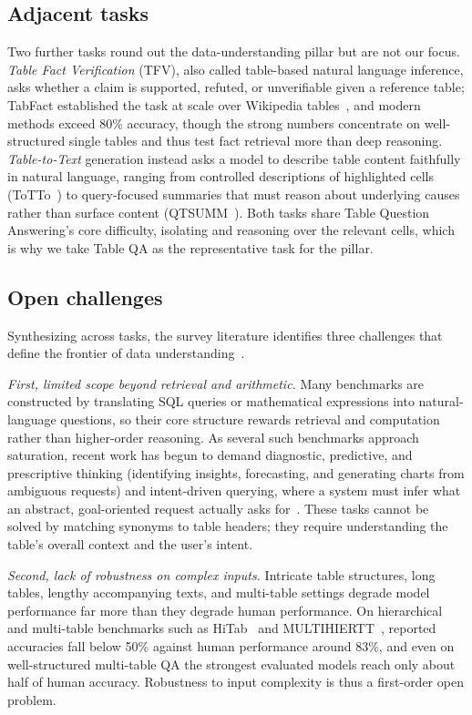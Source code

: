 \subsection{Adjacent tasks}
Two further tasks round out the data-understanding pillar but are not our focus. \emph{Table Fact Verification} (TFV), also called table-based natural language inference, asks whether a claim is supported, refuted, or unverifiable given a reference table; TabFact established the task at scale over Wikipedia tables~\cite{chen2020tabfact}, and modern methods exceed 80\% accuracy, though the strong numbers concentrate on well-structured single tables and thus test fact retrieval more than deep reasoning. \emph{Table-to-Text} generation instead asks a model to describe table content faithfully in natural language, ranging from controlled descriptions of highlighted cells (ToTTo~\cite{parikh2020totto}) to query-focused summaries that must reason about underlying causes rather than surface content (QTSUMM~\cite{zhao2023qtsumm}). Both tasks share Table Question Answering's core difficulty, isolating and reasoning over the relevant cells, which is why we take Table QA as the representative task for the pillar.

\subsection{Open challenges}
Synthesizing across tasks, the survey literature identifies three challenges that define the frontier of data understanding~\cite{wu2025tabular}.

\emph{First, limited scope beyond retrieval and arithmetic.} Many benchmarks are constructed by translating SQL queries or mathematical expressions into natural-language questions, so their core structure rewards retrieval and computation rather than higher-order reasoning. As several such benchmarks approach saturation, recent work has begun to demand diagnostic, predictive, and prescriptive thinking (identifying insights, forecasting, and generating charts from ambiguous requests) and intent-driven querying, where a system must infer what an abstract, goal-oriented request actually asks for~\cite{lei2024spider2,he2024text2analysis}. These tasks cannot be solved by matching synonyms to table headers; they require understanding the table's overall context and the user's intent.

\emph{Second, lack of robustness on complex inputs.} Intricate table structures, long tables, lengthy accompanying texts, and multi-table settings degrade model performance far more than they degrade human performance. On hierarchical and multi-table benchmarks such as HiTab~\cite{cheng2022hitab} and MULTIHIERTT~\cite{zhao2022multihiertt}, reported accuracies fall below 50\% against human performance around 83\%, and even on well-structured multi-table QA the strongest evaluated models reach only about half of human accuracy. Robustness to input complexity is thus a first-order open problem.

